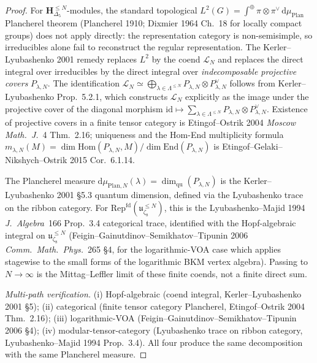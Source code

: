 \begin{proof}
For $\mathbf H_{\Delta_5}^{\leq N}$-modules, the standard topological
$L^2(G) = \int^\oplus \pi\otimes \pi^\vee\, \mathrm d\mu_{\mathrm{Plan}}$
Plancherel theorem (Plancherel 1910; Dixmier 1964 Ch.\ 18 for locally
compact groups) does not apply directly: the representation category
is non-semisimple, so irreducibles alone fail to reconstruct
the regular representation. The Kerler--Lyubashenko 2001 remedy
replaces $L^2$ by the coend $\mathcal L_N$ and replaces the direct
integral over irreducibles by the direct integral over
\emph{indecomposable projective covers} $P_{\lambda,N}$. The
identification $\mathcal L_N \simeq \bigoplus_{\lambda\in\Lambda^{\leq N}}
P_{\lambda,N} \otimes P_{\lambda,N}^\vee$ follows from
Kerler--Lyubashenko Prop.\ 5.2.1, which
constructs $\mathcal L_N$ explicitly as the image under the projective
cover of the diagonal morphism $\mathrm{id}\mapsto
\sum_{\lambda\in\Lambda^{\leq N}} P_{\lambda,N}\otimes
P_{\lambda,N}^\vee$. Existence of
projective covers in a finite tensor category is Etingof--Ostrik
2004 \emph{Moscow Math.\ J.}~4 Thm.\ 2.16; uniqueness and the Hom-End
multiplicity formula $m_{\lambda,N}(M) = \dim\mathrm{Hom}(P_{\lambda,N}, M)/
\dim\mathrm{End}(P_{\lambda,N})$ is
Etingof--Gelaki--Nikshych--Ostrik 2015 Cor.\ 6.1.14.

The Plancherel measure
$\mathrm d\mu_{\mathrm{Plan},N}(\lambda) = \dim_{\mathrm{qu}}(P_{\lambda,N})$
is the Kerler--Lyubashenko 2001 \S5.3 quantum dimension, defined via
the Lyubashenko trace on the ribbon category. For
\(\mathrm{Rep}^{\mathrm{fd}}(\mathfrak u_{\zeta_8}^{\leq N})\), this is the
Lyubashenko--Majid 1994 \emph{J.~Algebra}~166 Prop.\ 3.4 categorical
trace, identified with the Hopf-algebraic integral on
\(\mathfrak u_{\zeta_8}^{\leq N}\) (Feigin--Gainutdinov--Semikhatov--Tipunin
2006 \emph{Comm.\ Math.\ Phys.}~265 \S4, for the logarithmic-VOA case
which applies stagewise to the small forms of the logarithmic BKM
vertex algebra).  Passing to \(N\to\infty\) is the Mittag--Leffler
limit of these finite coends, not a finite direct sum.

\emph{Multi-path verification.}
(i) Hopf-algebraic (coend integral, Kerler--Lyubashenko 2001 \S5);
(ii) categorical (finite tensor category Plancherel, Etingof--Ostrik
2004 Thm.\ 2.16);
(iii) logarithmic-VOA (Feigin--Gainutdinov--Semikhatov--Tipunin 2006
\S4);
(iv) modular-tensor-category (Lyubashenko trace on ribbon
category, Lyubashenko--Majid 1994 Prop.\ 3.4). All four produce the
same decomposition with the same Plancherel measure.
\end{proof}

